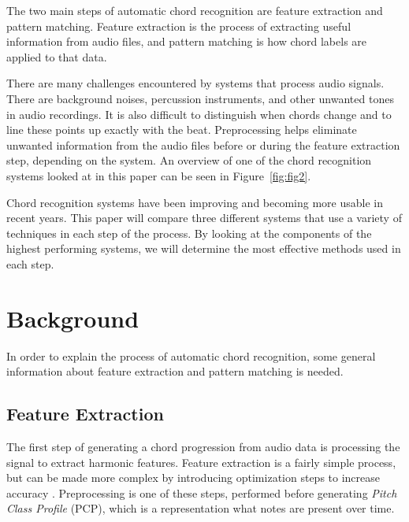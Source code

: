 \documentclass{sig-alternate}
\begin{document}
The two main steps of automatic chord recognition are feature extraction and pattern matching. Feature extraction is the process of extracting useful information from audio files, and pattern matching is how chord labels are applied to that data. 

There are many challenges encountered by systems that process audio signals. There are background noises, percussion instruments, and other unwanted tones in audio recordings. It is also difficult to distinguish when chords change and to line these points up exactly with the beat. Preprocessing helps eliminate unwanted information from the audio files before or during the feature extraction step, depending on the system. An overview of one of the chord recognition systems looked at in this paper can be seen in Figure~\ref{fig:fig2}.

Chord recognition systems have been improving and becoming more usable in recent years. This paper will compare three different systems that use a variety of techniques in each step of the process. By looking at the components of the highest performing systems, we will determine the most effective methods used in each step. 

\begin{figure*}
\centering
{}
\caption{Overview of the chord recognition system used in research case 1~\cite{Morman:2006}.}
\label{fig:fig2}
\end{figure*}  

\section{Background}
In order to explain the process of automatic chord recognition, some general information about feature extraction and pattern matching is needed.

\subsection{Feature Extraction}

The first step of generating a chord progression from audio data is processing the signal to extract harmonic features. Feature extraction is a fairly simple process, but can be made more complex by introducing optimization steps to increase accuracy \cite{McVicar:2014}. Preprocessing is one of these steps, performed before generating \textit{Pitch Class Profile} (PCP), which is a representation what notes are present over time.
\end{document}
